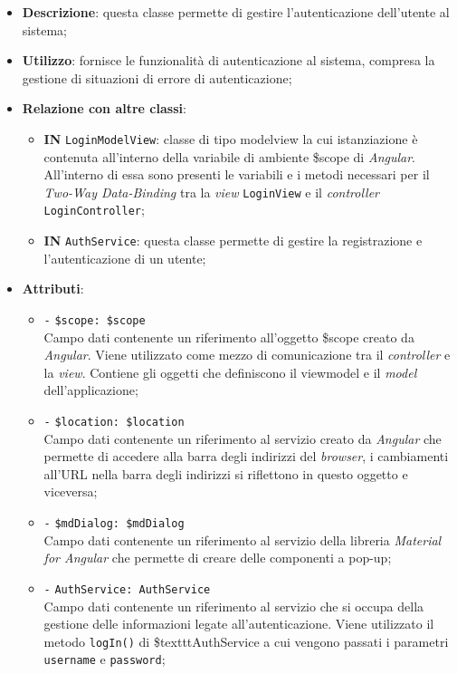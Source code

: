 \begin{itemize}
	\item \textbf{Descrizione}: questa classe permette di gestire l'autenticazione dell'utente al sistema; 
	\item \textbf{Utilizzo}: fornisce le funzionalità di autenticazione al sistema, compresa la gestione di situazioni di errore di autenticazione;
	\item \textbf{Relazione con altre classi}:
	\begin{itemize}
		\item \textbf{IN} \texttt{LoginModelView}: classe di tipo modelview la cui istanziazione è contenuta all'interno della variabile di ambiente \$scope di \textit{Angular}. All'interno di essa sono presenti le variabili e i metodi necessari per il \textit{Two-Way Data-Binding} tra la \textit{view} \texttt{LoginView} e il \textit{controller} \texttt{LoginController};
		\item \textbf{IN} \texttt{AuthService}: questa classe permette di gestire la registrazione e l'autenticazione di un utente;
	\end{itemize}
	\item \textbf{Attributi}:
	\begin{itemize}
		\item \texttt{-} \texttt{\$scope: \$scope} \\
		Campo dati contenente un riferimento all’oggetto \$scope creato da \textit{Angular}. Viene utilizzato come mezzo di comunicazione tra il \textit{controller} e la \textit{view}. Contiene gli oggetti che definiscono il viewmodel e il \textit{model} dell’applicazione;
		\item \texttt{-} \texttt{\$location: \$location} \\
		Campo dati contenente un riferimento al servizio creato da \textit{Angular} che permette di accedere alla barra degli indirizzi del \textit{browser}, i cambiamenti all’URL nella barra degli indirizzi si riflettono in questo oggetto e viceversa;
		\item \texttt{-} \texttt{\$mdDialog: \$mdDialog} \\
		Campo dati contenente un riferimento al servizio della libreria \textit{Material for Angular} che permette di creare delle componenti a pop-up;
		\item \texttt{-} \texttt{AuthService: AuthService} \\
		Campo dati contenente un riferimento al servizio che si occupa della gestione delle informazioni legate all'autenticazione. Viene utilizzato il metodo \texttt{logIn()} di \$texttt{AuthService} a cui vengono passati i parametri \texttt{username} e \texttt{password};

\end{itemize}
\end{itemize}
